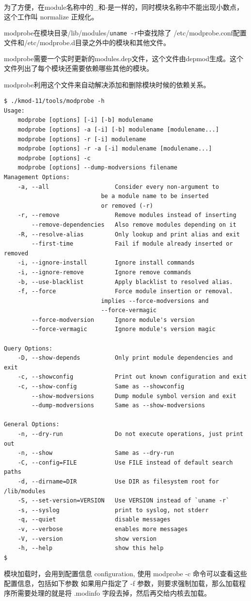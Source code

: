 \documentclass[11pt,a4paper]{article}
\begin{document}
为了方便，在module名称中的\_和-是一样的，同时模块名称中不能出现小数点，这个工作叫
normalize 正规化。

modprobe在模块目录/lib/modules/\texttt{uname -r}中查找除了
/etc/modprobe.conf配置文件和/etc/modprobe.d目录之外中的模块和其他文件。

modprobe需要一个实时更新的modules.dep文件，这个文件由depmod生成。这个文件列出了每个模块还需要依赖哪些其他的模块。

modprobe利用这个文件来自动解决添加和删除模块时候的依赖关系。

{\begin{shaded}\begin{verbatim}
$ ./kmod-11/tools/modprobe -h
Usage:
    modprobe [options] [-i] [-b] modulename
    modprobe [options] -a [-i] [-b] modulename [modulename...]
    modprobe [options] -r [-i] modulename
    modprobe [options] -r -a [-i] modulename [modulename...]
    modprobe [options] -c
    modprobe [options] --dump-modversions filename
Management Options:
    -a, --all                   Consider every non-argument to
                            be a module name to be inserted
                            or removed (-r)
    -r, --remove                Remove modules instead of inserting
        --remove-dependencies   Also remove modules depending on it
    -R, --resolve-alias         Only lookup and print alias and exit
        --first-time            Fail if module already inserted or removed
    -i, --ignore-install        Ignore install commands
    -i, --ignore-remove         Ignore remove commands
    -b, --use-blacklist         Apply blacklist to resolved alias.
    -f, --force                 Force module insertion or removal.
                            implies --force-modversions and
                            --force-vermagic
        --force-modversion      Ignore module's version
        --force-vermagic        Ignore module's version magic

Query Options:
    -D, --show-depends          Only print module dependencies and exit
    -c, --showconfig            Print out known configuration and exit
    -c, --show-config           Same as --showconfig
        --show-modversions      Dump module symbol version and exit
        --dump-modversions      Same as --show-modversions

General Options:
    -n, --dry-run               Do not execute operations, just print out
    -n, --show                  Same as --dry-run
    -C, --config=FILE           Use FILE instead of default search paths
    -d, --dirname=DIR           Use DIR as filesystem root for /lib/modules
    -S, --set-version=VERSION   Use VERSION instead of `uname -r`
    -s, --syslog                print to syslog, not stderr
    -q, --quiet                 disable messages
    -v, --verbose               enables more messages
    -V, --version               show version
    -h, --help                  show this help
$ 
\end{verbatim}\end{shaded}}
模块加载时，会用到配置信息 configuration, 使用 modprobe -c
命令可以查看这些配置信息，包括如下参数 如果用户指定了 -f
参数，则要求强制加载，那么加载程序所需要处理的就是将 .modinfo
字段去掉，然后再交给内核去加载。
\end{document}
